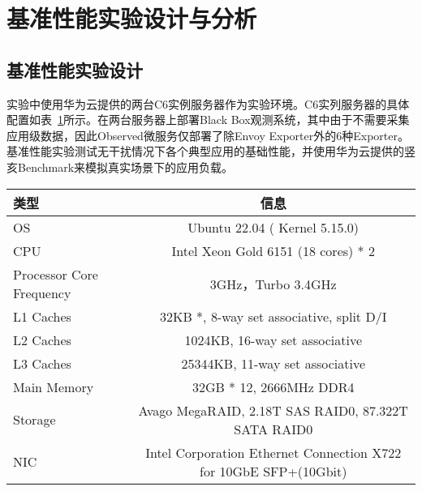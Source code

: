 \section{基准性能实验设计与分析}

\subsection{基准性能实验设计}

实验中使用华为云提供的两台C6实例服务器作为实验环境。C6实列服务器的具体配置如表~\ref{tab:c6_info}所示。在两台服务器上部署Black Box观测系统，其中由于不需要采集应用级数据，因此Observed微服务仅部署了除Envoy Exporter外的6种Exporter。基准性能实验测试无干扰情况下各个典型应用的基础性能，并使用华为云提供的竖亥Benchmark来模拟真实场景下的应用负载。

\begin{table}[!htbp]
    \label{tab:c6_info}
    \footnotesize%
    \setlength{\tabcolsep}{4pt}%
    \renewcommand{\arraystretch}{1.25}%
    \centering
    \begin{tabular}{lc}
        \hline
        类型 & 信息 \\
        \hline
        OS & Ubuntu 22.04 ( Kernel 5.15.0) \\
        CPU & Intel Xeon Gold 6151 (18 cores) * 2 \\
        Processor Core Frequency & 3GHz，Turbo 3.4GHz \\
        L1 Caches & 32KB *,  8-way set associative, split D/I \\
        L2 Caches & 1024KB, 16-way set associative \\
        L3 Caches & 25344KB, 11-way set associative \\
        Main Memory & 32GB * 12, 2666MHz DDR4 \\
        Storage & Avago MegaRAID, 2.18T SAS RAID0, 87.322T SATA RAID0 \\
        NIC & Intel Corporation Ethernet Connection X722 for 10GbE SFP+(10Gbit) \\
        \hline
    \end{tabular}
\end{table}





